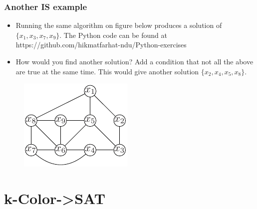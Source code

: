 \documentclass{beamer}
\begin{document}
\begin{frame}
  \frametitle{Another IS example}
  \begin{itemize}
  \item Running the same algorithm on figure below produces a solution of $\{x_1,x_3,x_7,x_9\}$. The Python code can be found at https://github.com/hikmatfarhat-ndu/Python-exercises
\item How would you find another solution? Add a condition that not all the above are true at the same time. This would give another solution $\{x_2,x_4,x_5,x_8\}$.
  \end{itemize}
  \begin{figure}[h]
    \centering
\includegraphics{np-figs/independent3}
  \end{figure}
  \end{frame}

\section{k-Color->SAT}
\end{document}
